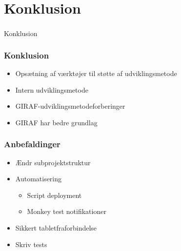 \section[Konklusion]{Konklusion}

\begin{frame}
  \frametitle{}
  \begin{center}
    {\Huge Konklusion}
  \end{center}
\end{frame}

\begin{frame}
  \frametitle{Konklusion}
  \begin{itemize}
    \item Opsætning af værktøjer til støtte af udviklingsmetode
    \item Intern udviklingsmetode
    \item GIRAF-udviklingsmetodeforberinger
    \item GIRAF har bedre grundlag
  \end{itemize}
\end{frame}

\begin{frame}
  \frametitle{Anbefaldinger}
  \begin{itemize}
    \item Ændr subprojektstruktur
    \item Automatisering 
    \begin{itemize}
      \item Script deployment
      \item Monkey test notifikationer
    \end{itemize}
    \item Sikkert tabletfraforbindelse
    \item Skriv tests
  \end{itemize}
\end{frame}
